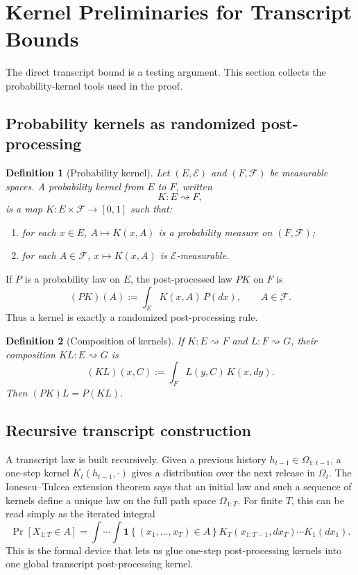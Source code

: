 \documentclass[conference,compsoc]{IEEEtran}
\newtheorem{definition}{Definition}
\newcommand{\ind}[1]{\mathbf{1}\!\left\{#1\right\}}
\begin{document}
\section{Kernel Preliminaries for Transcript Bounds}
\label{sec:kernels}

The direct transcript bound is a testing argument. This section collects the probability-kernel tools used in the proof.

\subsection{Probability kernels as randomized post-processing}

\begin{definition}[Probability kernel]
Let $(E,\mathcal E)$ and $(F,\mathcal F)$ be measurable spaces. A probability kernel from $E$ to $F$, written
\[
K:E\rightsquigarrow F,
\]
is a map $K:E\times\mathcal F\to[0,1]$ such that:
\begin{enumerate}[leftmargin=1.4em]
    \item for each $x\in E$, $A\mapsto K(x,A)$ is a probability measure on $(F,\mathcal F)$;
    \item for each $A\in\mathcal F$, $x\mapsto K(x,A)$ is $\mathcal E$-measurable.
\end{enumerate}
\end{definition}

If $P$ is a probability law on $E$, the post-processed law $PK$ on $F$ is
\[
(PK)(A):=\int_E K(x,A)\,P(dx),
\qquad A\in\mathcal F.
\]
Thus a kernel is exactly a randomized post-processing rule.

\begin{definition}[Composition of kernels]
If $K:E\rightsquigarrow F$ and $L:F\rightsquigarrow G$, their composition $KL:E\rightsquigarrow G$ is
\[
(KL)(x,C):=\int_F L(y,C)\,K(x,dy).
\]
Then $(PK)L=P(KL)$.
\end{definition}

\subsection{Recursive transcript construction}

A transcript law is built recursively. Given a previous history $h_{t-1}\in\Omega_{1:t-1}$, a one-step kernel $K_t(h_{t-1},\cdot)$ gives a distribution over the next release in $\Omega_t$. The Ionescu--Tulcea extension theorem says that an initial law and such a sequence of kernels define a unique law on the full path space $\Omega_{1:T}$. For finite $T$, this can be read simply as the iterated integral
\[
\Pr[X_{1:T}\in A]
=\int \cdots \int \ind{(x_1,\ldots,x_T)\in A}
K_T(x_{1:T-1},dx_T)\cdots K_1(dx_1).
\]
This is the formal device that lets us glue one-step post-processing kernels into one global transcript post-processing kernel.
\end{document}
